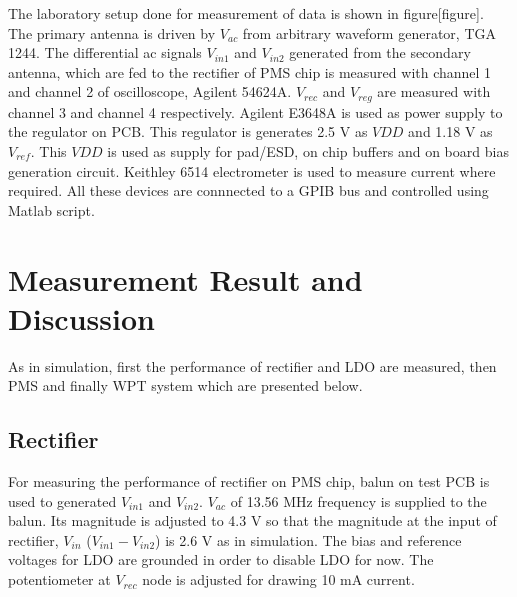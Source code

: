 \documentclass[UKenglish]{ifimaster}  %
\begin{document}
The laboratory setup done for measurement of data is shown in figure[figure]. The primary antenna is driven by $V_{ac}$ 
from arbitrary waveform generator, TGA 1244. The differential ac signals  $V_{in1}$ and $V_{in2}$ generated from the 
secondary antenna, which are fed to the rectifier of PMS chip is measured with channel 1 and channel 2 of oscilloscope,
Agilent 54624A. $V_{rec}$ and $V_{reg}$ are measured with channel 3 and channel 4 respectively. Agilent E3648A is used as 
power supply to the regulator on PCB. This regulator is generates 2.5 V as $VDD$ and 1.18 V as $V_{ref}$. This $VDD$ is 
used as supply for pad/ESD, on chip buffers and on board bias generation circuit. Keithley 6514 electrometer is used to 
measure current where required. All these devices are connnected to a GPIB bus and controlled using Matlab script.

\section{Measurement Result and Discussion} %
As in simulation, first the performance of rectifier and LDO are measured, then PMS and finally WPT system which are 
presented below. 

\subsection{Rectifier} %
For measuring the performance of rectifier on PMS chip, balun on test PCB is used to generated $V_{in1}$ and $V_{in2}$.  $V_{ac}$ of 
13.56 MHz frequency is supplied to the balun. Its magnitude is adjusted to 4.3 V so that the magnitude at the input of rectifier, 
$V_{in}$ ($V_{in1} -V_{in2}$) is 2.6 V as in simulation. The bias and reference voltages for LDO are grounded in order 
to disable LDO for now. The potentiometer at $V_{rec}$ node is adjusted for drawing 10 mA current. \\
\end{document}
